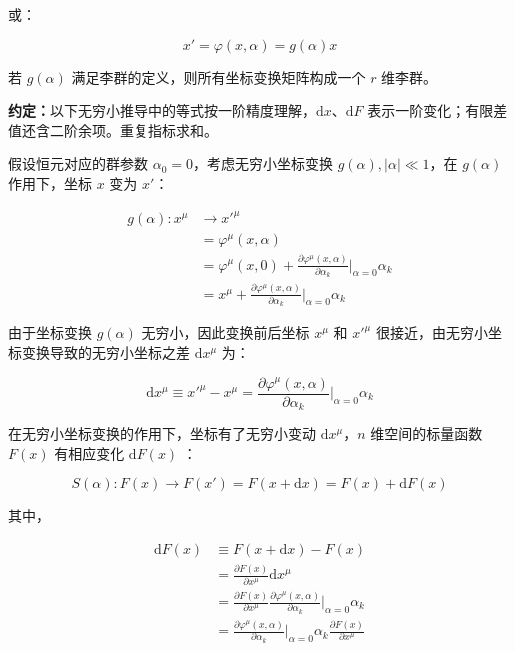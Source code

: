 或：

\begin{equation}
x' = \varphi\left(x,\alpha\right)=g\left(\alpha\right) x
\end{equation}

若 $g\left(\alpha\right)$ 满足李群的定义，则所有坐标变换矩阵构成一个 $r$ 维李群。

\textbf{约定：}以下无穷小推导中的等式按一阶精度理解，$\mathrm{d}x$、$\mathrm{d}F$ 表示一阶变化；有限差值还含二阶余项。重复指标求和。

假设恒元对应的群参数 $\alpha_0=0$，考虑无穷小坐标变换 $g\left(\alpha\right),\left|\alpha \right|\ll 1$，在 $g\left(\alpha\right)$ 作用下，坐标 $x$ 变为 $x'$：

\begin{align}
g\left(\alpha\right):x^\mu
&\to x'^\mu \\
&=\varphi^\mu\left(x,\alpha\right) \\
&=\varphi^\mu\left(x,0\right) + \frac{\partial \varphi^\mu\left(x,\alpha\right) }{\partial \alpha_k } \bigg|_{\alpha=0} \alpha_k \\
&=x^\mu + \frac{\partial \varphi^\mu\left(x,\alpha\right) }{\partial \alpha_k } \bigg|_{\alpha=0} \alpha_k
\end{align}

由于坐标变换 $g\left(\alpha\right)$ 无穷小，因此变换前后坐标 $x^\mu$ 和 $x'^\mu$ 很接近，由无穷小坐标变换导致的无穷小坐标之差 $\mathrm{d}x^\mu$ 为：

\begin{equation}
\mathrm{d}x^\mu
\equiv x'^\mu - x^\mu
=\frac{\partial \varphi^\mu\left(x,\alpha\right) }{\partial \alpha_k } \bigg|_{\alpha=0} \alpha_k
\end{equation}

在无穷小坐标变换的作用下，坐标有了无穷小变动 $\mathrm{d}x^\mu$，$n$ 维空间的标量函数 $F\left(x\right)$ 有相应变化 $\mathrm{d} F\left(x\right)$ ：

\begin{equation}
S\left(\alpha\right):F\left(x\right)\to F\left(x'\right)=F\left(x+\mathrm{d}x\right)=F\left(x\right)+\mathrm{d}F\left(x\right)
\end{equation}

其中，

\begin{align}
\mathrm{d}F\left(x\right)
&\equiv F\left(x+\mathrm{d}x\right) - F\left(x\right) \\
&=\frac{\partial F\left(x\right) }{\partial x^\mu } \mathrm{d}x^\mu \\
&=\frac{\partial F\left(x\right) }{\partial x^\mu } \frac{\partial \varphi^\mu\left(x,\alpha\right) }{\partial \alpha_k } \bigg|_{\alpha=0} \alpha_k \\
&=\frac{\partial \varphi^\mu\left(x,\alpha\right) }{\partial\alpha_k } \bigg|_{\alpha=0} \alpha_k \frac{\partial F\left(x\right) }{\partial 
x^\mu } 
\end{align}

